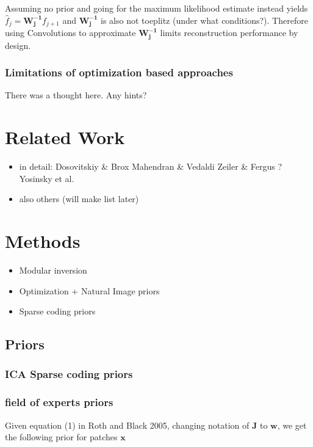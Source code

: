 \documentclass{article}
\begin{document}
Assuming no prior and going for the maximum likelihood estimate instead yields $\hat{f}_j = \bm{W_j^{-1}} f_{j+1}$ and $\bm{W_j^{-1}}$ is also not toeplitz (under what conditions?). Therefore using Convolutions to approximate $\bm{W_j^{-1}}$ limits reconstruction performance by design.


\subsubsection{Limitations of optimization based approaches}

There was a thought here. Any hints?

\section{Related Work}

\begin{itemize}
	\item in detail:
		\subitem Dosovitskiy \& Brox
		\subitem Mahendran \& Vedaldi
		\subitem Zeiler \& Fergus ?
		\subitem Yosinsky et al.
	\item also others (will make list later)
\end{itemize}


\section{Methods}

\begin{itemize}
	\item Modular inversion
	\item Optimization + Natural Image priors
	\item Sparse coding priors
\end{itemize}

\subsection{Priors}

\subsubsection{ICA Sparse coding priors}


\subsubsection{field of experts priors}

Given equation (1) in Roth and Black 2005, changing notation of $\mathbf{J}$ to $\mathbf{w}$, we get the following prior for patches $\mathbf{x}$
\end{document}
